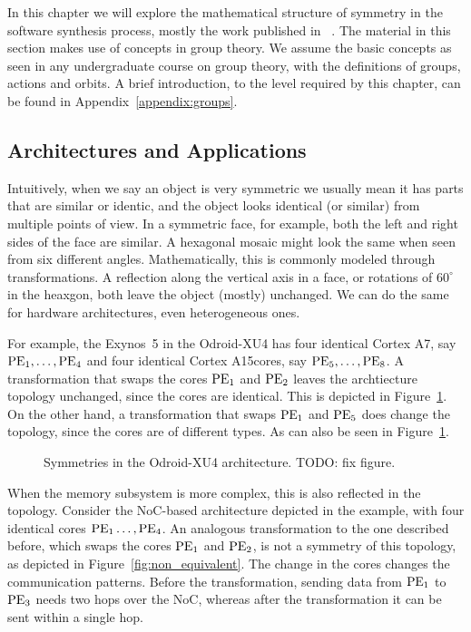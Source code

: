 In this chapter we will explore the mathematical structure of symmetry in the software synthesis process, mostly the work published in ~\cite{goens_iess15,goens_taco17,goens_scopes17,goens_mcsoc18,goens_tcad21}.
The material in this section makes use of concepts in group theory.
We assume the basic concepts as seen in any undergraduate course on group
theory, with the definitions of groups, actions and orbits.
A brief introduction, to the level required by this chapter, can be found in Appendix~\ref{appendix:groups}. 

\subsection{Architectures and Applications}
\label{sec:arch_app_symmetries}

Intuitively, when we say an object is very symmetric we usually mean it has parts that are similar or identic, and the object looks identical (or similar) from multiple points of view.
In a symmetric face, for example, both the left and right sides of the face are similar. A hexagonal mosaic might look the same when seen from six different angles.
Mathematically, this is commonly modeled through transformations. A reflection along the vertical axis in a face, or rotations of $60^\circ$ in the heaxgon, both leave the object (mostly) unchanged.
We can do the same for hardware architectures, even heterogeneous ones.

For example, the Exynos~5 in the Odroid-XU4 has four identical Cortex A7\texttrademark, say $\operatorname{PE}_1,\ldots,\operatorname{PE}_4$ and four identical Cortex A15\texttrademark cores, say $\operatorname{PE}_5,\ldots,\operatorname{PE}_8$.
A transformation that swaps the cores $\operatorname{PE}_1$ and $\operatorname{PE}_2$ leaves the archtiecture topology unchanged, since the cores are identical. This is depicted in Figure~\ref{fig:exynos_symmetries}.
On the other hand, a transformation that swaps $\operatorname{PE}_1$ and $\operatorname{PE}_5$ does change the topology, since the cores are of different types. As can also be seen in Figure~\ref{fig:exynos_symmetries}.
\begin{figure}[h]
	\centering
\resizebox{0.3\textwidth}{!}{
   \begin{tikzpicture}
     
   \end{tikzpicture}
 }
   \caption{Symmetries in the Odroid-XU4 architecture. TODO: fix figure.}
   \label{fig:exynos_symmetries}
\end{figure}

When the memory subsystem is more complex, this is also reflected in the topology. Consider the \ac{NoC}-based architecture depicted in the example, with four identical cores $\operatorname{PE}_1\ldots,\operatorname{PE}_4$.
An analogous transformation to the one described before, which swaps the cores $\operatorname{PE}_1$ and $\operatorname{PE}_2$, is not a symmetry of this topology, as depicted in Figure~\ref{fig:non_equivalent}.
The change in the cores changes the communication patterns.
Before the transformation, sending data from $\operatorname{PE}_1$ to $\operatorname{PE}_3$ needs two hops over the \ac{NoC}, whereas after the transformation it can be sent within a single hop.

